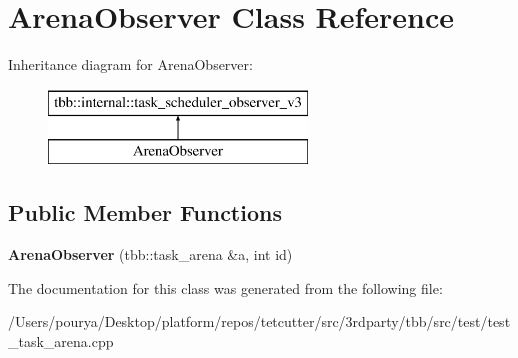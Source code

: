 \hypertarget{classArenaObserver}{}\section{Arena\+Observer Class Reference}
\label{classArenaObserver}
Inheritance diagram for Arena\+Observer\+:\begin{figure}[H]
\begin{center}
\leavevmode
\includegraphics[height=2.000000cm]{classArenaObserver}
\end{center}
\end{figure}
\subsection*{Public Member Functions}
\begin{DoxyCompactItemize}
\item 
\hypertarget{classArenaObserver_a74f6c517a10b4466669a122ca0543295}{}{\bfseries Arena\+Observer} (tbb\+::task\+\_\+arena \&a, int id)\label{classArenaObserver_a74f6c517a10b4466669a122ca0543295}

\end{DoxyCompactItemize}


The documentation for this class was generated from the following file\+:\begin{DoxyCompactItemize}
\item 
/\+Users/pourya/\+Desktop/platform/repos/tetcutter/src/3rdparty/tbb/src/test/test\+\_\+task\+\_\+arena.\+cpp\end{DoxyCompactItemize}
